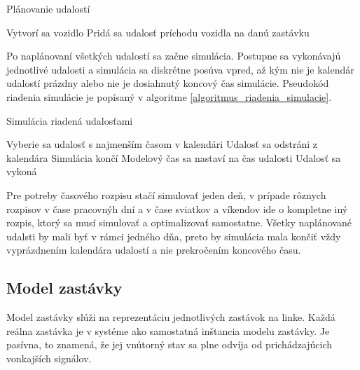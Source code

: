\vspace*{\dimexpr 0.5\baselineskip\relax}
\begin{algorithm}[H]
  \label{algoritmus_planovanie_udalosti}
  \caption{Plánovanie udalostí}
  \begin{algorithmic}[1]
      \STATE Vytvorí sa vozidlo
        \STATE Pridá sa udalosť príchodu vozidla na danú zastávku
      \ENDFOR
    \ENDFOR
  \end{algorithmic}
\end{algorithm}
\vspace*{\dimexpr 0.5\baselineskip\relax}

Po naplánovaní všetkých udalostí sa začne simulácia.
Postupne sa vykonávajú jednotlivé udalosti a simulácia sa diskrétne posúva vpred, až kým nie je kalendár udalostí prázdny alebo nie je dosiahnutý koncový čas simulácie.
Pseudokód riadenia simulácie je popísaný v algoritme \ref{algoritmus_riadenia_simulacie}.

\vspace*{\dimexpr 0.5\baselineskip\relax}
\begin{algorithm}[H]
\label{algoritmus_riadenia_simulacie}
\caption{Simulácia riadená udalosťami}
\begin{algorithmic}[1]
    \STATE Vyberie sa udalosť s najmenším časom v kalendári
    \STATE Udalosť sa odstráni z kalendára
      \STATE Simulácia končí
    \ENDIF
    \STATE Modelový čas sa nastaví na čas udalosti
    \STATE Udalosť sa vykoná
  \ENDWHILE
\end{algorithmic}
\end{algorithm}
\vspace*{\dimexpr 0.5\baselineskip\relax}

Pre potreby časového rozpisu stačí simulovať jeden deň, v prípade rôznych rozpisov v čase pracovnýh dní a v čase sviatkov a víkendov ide o kompletne iný rozpis, ktorý sa musí simulovať a optimalizovať samostatne.
Všetky naplánované udalsti by mali byť v rámci jedného dňa, preto by simulácia mala končiť vždy vyprázdnením kalendára udalostí a nie prekročením koncového času.

\subsection*{Model zastávky}
\label{model_zastavky}

Model zastávky slúži na reprezentáciu jednotlivých zastávok na linke.
Každá reálna zastávka je v systéme ako samostatná inštancia modelu zastávky.
Je pasívna, to znamená, že jej vnútorný stav sa plne odvíja od prichádzajúcich vonkajších signálov.

